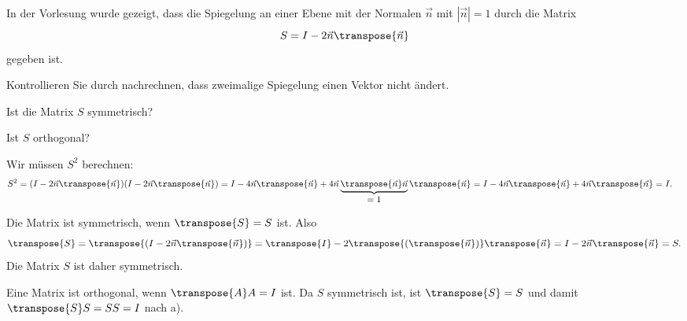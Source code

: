 In der Vorlesung wurde gezeigt, dass die Spiegelung an einer Ebene
mit der Normalen $\vec n$ mit $|\vec n|=1$ durch die Matrix
\[
S=I-2\vec n \transpose{\vec{n}}
\]
gegeben ist.
\begin{teilaufgaben}
\item Kontrollieren Sie durch nachrechnen, dass zweimalige Spiegelung einen
Vektor nicht ändert.
\item Ist die Matrix $S$ symmetrisch?
\item Ist $S$ orthogonal?
\end{teilaufgaben}


\begin{loesung}
\begin{teilaufgaben}
\item
Wir müssen $S^2$ berechnen:
\begin{align*}
S^2
&=
(I-2\vec{n}\transpose{\vec{n}}) (I-2\vec{n}\transpose{\vec{n}})
=
I
-
4\vec{n}\transpose{\vec{n}}
+
4\vec{n}\underbrace{\transpose{\vec{n}}\vec{n}}_{\displaystyle=1}
\transpose{\vec{n}}
=
I-4\vec{n}\transpose{\vec{n}} +4\vec{n} \transpose{\vec{n}}
=
I.
\end{align*}
\item
Die Matrix ist symmetrisch, wenn $\transpose{S}=S$ ist.
Also
\[
\transpose{S}
=
\transpose{(I-2\vec{n}\transpose{\vec{n}})}
=
\transpose{I} - 2\transpose{(\transpose{\vec{n}})} \transpose{\vec{n}}
=
I-2\vec{n}\transpose{\vec{n}}
=
S.
\]
Die Matrix $S$ ist daher symmetrisch.
\item
Eine Matrix ist orthogonal, wenn $\transpose{A}A=I$ ist.
Da $S$ symmetrisch ist, ist $\transpose{S}=S$ und damit
$\transpose{S}S=SS=I$ nach a).
\end{teilaufgaben}
\end{loesung}

